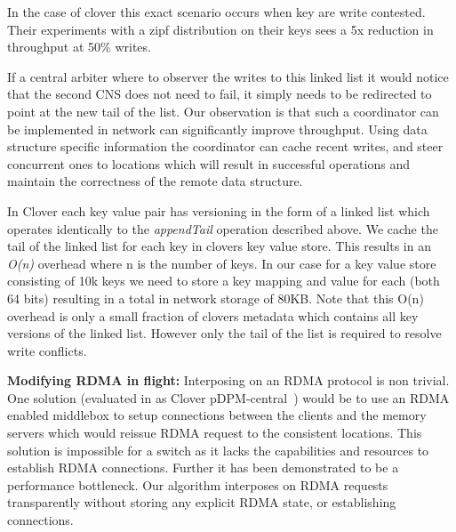 In the case of clover this exact scenario occurs when key are write
contested. Their experiments with a zipf distribution on their keys
sees a 5x reduction in throughput at 50\% writes.

If a central arbiter where to observer the writes to this linked list
it would notice that the second CNS does not need to fail, it simply
needs to be redirected to point at the new tail of the list. 
Our observation is that such a coordinator can be implemented in
network can significantly improve throughput. Using data structure
specific information the coordinator can cache recent writes, and
steer concurrent ones to locations which will result in successful
operations and maintain the correctness of the remote data structure.

In Clover each key value pair has versioning in the form of a linked
list which operates identically to the \textit{appendTail} operation
described above. We cache the tail of the linked list for each key in
clovers key value store. This results in an \textit{O(n)} overhead
where n is the number of keys. In our case for a key value store
consisting of 10k keys we need to store a key mapping and value for
each (both 64 bits) resulting in a total in network storage of 80KB.
Note that this O(n) overhead is only a small fraction of clovers
metadata which contains all key versions of the linked list. However
only the tail of the list is required to resolve write conflicts.

\textbf{Modifying RDMA in flight:} Interposing on an RDMA protocol is
non trivial. One solution (evaluated in as Clover
pDPM-central~\cite{clover}) would be to use an RDMA enabled middlebox
to setup connections between the clients and the memory servers which
would reissue RDMA request to the consistent locations. This solution
is impossible for a switch as it lacks the capabilities and resources
to establish RDMA connections. Further it has been demonstrated to be
a performance bottleneck. Our algorithm interposes on RDMA requests
transparently without storing any explicit RDMA state, or establishing
connections.

